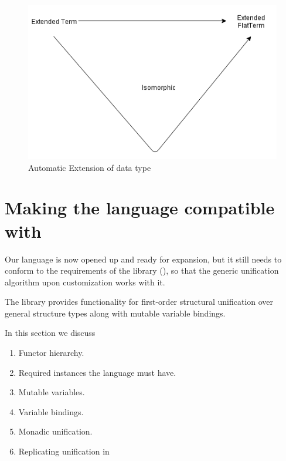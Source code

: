 \documentclass[thesis-solanki.tex]{subfiles}
\begin{document}
\begin{figure}[H]
  \includegraphics[width=1\textwidth, scale=0.5]{extended_data_type_2.png}
  \caption{Automatic Extension of data type}
  \label{fig:automatic-extension}
\end{figure}

\section{Making the language compatible with \protect{}}\label{sec:making-lang-comp}


Our language is now opened up and ready for expansion, but it still needs to conform to the requirements of the
 library (\cite{unification-fd-lib}), so that the generic unification algorithm upon
customization works with it.

  The library provides functionality for first-order structural unification over general structure types along with
  mutable variable bindings.

In this section we discuss
\begin{enumerate}
\item Functor hierarchy.

\item Required instances the language must have.

\item Mutable variables.

\item Variable bindings.

\item Monadic unification.

\item Replicating  unification in 
\end{enumerate}
\end{document}
